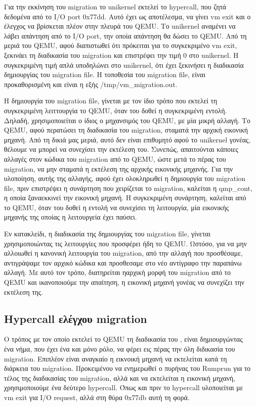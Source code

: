 Για την εκκίνηση του migration το unikernel εκτελεί το hypercall, που ζητά
δεδομένα από το I/O port 0x77dd. Αυτό έχει ως αποτέλεσμα, να γίνει vm exit και ο
έλεγχος να βρίσκεται πλέον στην πλευρά του QEMU. Το unikernel αναμένει να λάβει
απάντηση από το I/O port, την οποία απάντηση θα δώσει το QEMU. Από τη μεριά του
QEMU, αφού διαπιστωθεί ότι πρόκειται για το συγκεκριμένο vm exit, ξεκινάει τη
διαδικασία του migration και επιστρέφει την τιμή 0 στο unikernel. H συγκεκριμένη
τιμή απλά υποδηλώνει στο unikernel, ότι έχει ξεκινήσει η διαδικασία δημιουργίας
του migration file. Η τοποθεσία του migration file, είναι προκαθορισμένη και
είναι η εξής /tmp/vm\_migration.out. 

Η δημιουργία του migration file, γίνεται με τον ίδιο τρόπο που εκτελεί τη
συγκεκριμένη λειττουργία το QEMU, όταν του δοθεί η συγκεκριμένη εντολή. Δηλαδή,
χρησιμοποιείται ο ίδιος ο μηχανσιμός του QEMU, με μία μικρή αλλαγή. Το QEMU,
αφού περατώσει τη διαδικασία του migration, σταματά την αρχική εικονική μηχανή.
Από τη δικιά μας μεριά, αυτό δεν είναι επιθυμητό αφού το unikernel γονέας,
θέλουμε να μπορεί να συνεχίσει την εκτέλεση του. Συνεπώς, απαιτούνται κάποιες
αλλαγές στον κώδικα του migration από το QEMU, ώστε μετά το πέρας του migration,
να μην σταματά η εκτέλεση της αρχικής εικονικής μηχανής. Για την υλοποίηση,
αυτής της αλλαγής, αφού έχει ολοκληρωθεί η δημιουργία του migration file, πριν
επιστρέψει η συνάρτηση που χειρίζεται το migration, καλείται η qmp\_cont, η
οποία ξαναεκκινεί την εικονική μηχανή. Η συγκεκριμένη συνάρτηση, καλείται από το
QEMU, όταν του δοθεί η εντολή να συνεχίσει τη λειτουργία, μία εικονικής μηχανής
της οποίας η λειτουργεία έχει παύσει. 

Εν κατακλείδι, η διαδικασία της δημιουργίας του migration file, γίνεται
χρησιμοποιώντας τις λειτουργίες που προσφέρει ήδη το QEMU. Ωστόσο, για να μην
αλλοιωθεί η κανονική λειτουργία του migration, από την αλλαγή που προσθέσαμε,
αντιγράψαμε τον αρχικό κώδικα και προσθεσαμε στο νέο αντίγραφο την παραπάνω
αλλαγή. Με αυτό τον τρόπο, διατηρείται ηαρχική μορφή του migration από το QEMU
και ικανοποιούμε την απαίτηση, η εικονική μηχανή γονέας να συνεχίζει την
εκτέλεση της. 

\subsection{Hypercall ελέγχου migration}

Ο τρόπος με τον οποίο εκτελεί το QEMU τη διαδικασία του , είναι
δημιουργώντας ένα νήμα, που έχει ένα και μόνο ρόλο, να φέρει εις πέρας την όλη
διδικασία του migration. Επιπλέον είναι αναγκαίο η εικνοική μηχανή να εκτελείται
κατά τη διάρκεια του migration. Προκειμένου να ενημερωθεί ο πυρήνας του Rumprun
για το τέλος της διαδικασίας του migration, αλλά και να εκτελείται η εικονική
μηχανή, χρησιμοποιούμε ένα δεύτερο hypercall. Όπως και πριν το hypercall
υλοποιείται με vm exit για Ι/Ο request, αλλά στη θύρα 0x77db αυτή τη φορά. 

